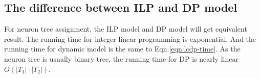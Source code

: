 \subsection{The difference between ILP and DP model}
For neuron tree assignment, the ILP model and DP model will get equivalent result. The running time for integer linear programming is exponential. And the running time for dynamic model is the same to Eqn.\ref{eqn:lcdp-time}. As the neuron tree is usually binary tree, the running time for DP is nearly linear $O(|T_1|\cdot|T_2|)$.
